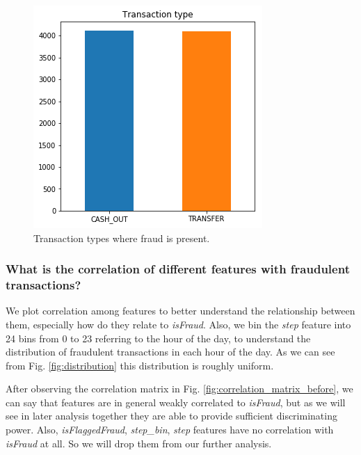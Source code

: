 \documentclass[letterpaper, 12 pt, conference]{ieeeconf}  %
\begin{document}
\begin{figure}[ht]
    \centering
        \includegraphics[width=\linewidth]{transaction_type.png}
    \caption{Transaction types where fraud is present.}
    \label{fig:transaction_type}
\end{figure}

\subsubsection{What is the correlation of different features with fraudulent transactions?}
We plot correlation among features to better understand the relationship between them, especially how do they relate to \textit{isFraud}. Also, we bin the \textit{step} feature into 24 bins from 0 to 23 referring to the hour of the day, to understand the distribution of fraudulent transactions in each hour of the day. As we can see from Fig. \ref{fig:distribution} this distribution is roughly uniform. 

After observing the correlation matrix in Fig. \ref{fig:correlation_matrix_before}, we can say that features are in general weakly correlated to \textit{isFraud}, but as we will see in later analysis together they are able to provide sufficient discriminating power.
Also, \textit{isFlaggedFraud}, \textit{step\_bin}, \textit{step} features have no correlation with \textit{isFraud} at all. So we will drop them from our further analysis.
\end{document}
